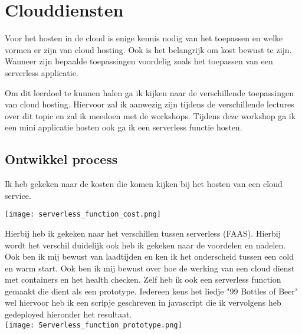 \section{Clouddiensten}\label{sec:clouddiensten}

Voor het hosten in de cloud is enige kennis nodig van het toepassen en welke vormen er zijn van cloud hosting.
Ook is het belangrijk om kost bewust te zijn.
Wanneer zijn bepaalde toepassingen voordelig zoals het toepassen van een serverless applicatie.


Om dit leerdoel te kunnen halen ga ik kijken naar de verschillende toepassingen van cloud hosting.
Hiervoor zal ik aanwezig zijn tijdens de verschillende lectures over dit topic en zal ik meedoen met de workshops.
Tijdens deze workshop ga ik een mini applicatie hosten ook ga ik een serverless functie hosten.

\subsection{Ontwikkel process}
Ik heb gekeken naar de kosten die komen kijken bij het hosten van een cloud service.

\texttt{[image: serverless\_function\_cost.png]}\label{fig:serverless_function_cost}


Hierbij heb ik gekeken naar het verschillen tussen serverless (FAAS).
Hierbij wordt het verschil duidelijk ook heb ik gekeken naar de voordelen en nadelen.
Ook ben ik mij bewust van laadtijden en ken ik het onderscheid tussen een cold en warm start.
Ook ben ik mij bewust over hoe de werking van een cloud dienst met containers en het health checken.
Zelf heb ik ook een serverless function gemaakt die dient als een prototype.
Iedereen kens het liedje "99 Bottles of Beer" wel hiervoor heb ik een scripje geschreven in javascript die ik vervolgens heb gedeployed hieronder het resultaat.\\
\texttt{[image: Serverless\_function\_prototype.png]}\label{fig:serverless_function_cost}\\

